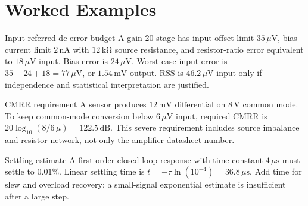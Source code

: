 \documentclass[10pt,letterpaper]{article}
\begin{document}
\section{Worked Examples}
\begin{CornellExamBox}{Input-referred dc error budget}
A gain-20 stage has input offset limit $35\,\mu\mathrm{V}$, bias-current limit $2\,\mathrm{nA}$ with $12\,\mathrm{k\Omega}$ source resistance, and resistor-ratio error equivalent to $18\,\mu\mathrm{V}$ input. Bias error is $24\,\mu\mathrm{V}$. Worst-case input error is $35+24+18=77\,\mu\mathrm{V}$, or $1.54\,\mathrm{mV}$ output. RSS is $46.2\,\mu\mathrm{V}$ input only if independence and statistical interpretation are justified.
\end{CornellExamBox}
\begin{CornellExamBox}{CMRR requirement}
A sensor produces $12\,\mathrm{mV}$ differential on $8\,\mathrm{V}$ common mode. To keep common-mode conversion below $6\,\mu\mathrm{V}$ input, required CMRR is $20\log_{10}(8/6\,\mu)=122.5\,\mathrm{dB}$. This severe requirement includes source imbalance and resistor network, not only the amplifier datasheet number.
\end{CornellExamBox}
\begin{CornellExamBox}{Settling estimate}
A first-order closed-loop response with time constant $4\,\mu\mathrm{s}$ must settle to $0.01\%$. Linear settling time is $t=-\tau\ln(10^{-4})=36.8\,\mu\mathrm{s}$. Add time for slew and overload recovery; a small-signal exponential estimate is insufficient after a large step.
\end{CornellExamBox}
\end{document}
